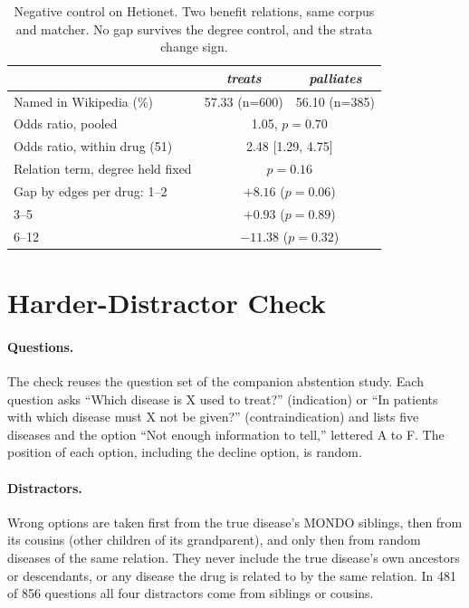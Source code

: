 \documentclass[letterpaper]{article} %
\begin{document}
\begin{table}[h]
\centering
\footnotesize
\setlength{\tabcolsep}{3pt}
\begin{tabular}{lcc}
\toprule
 & \emph{treats} & \emph{palliates} \\
\midrule
Named in Wikipedia (\%) & 57.33 (n=600) & 56.10 (n=385) \\
Odds ratio, pooled & \multicolumn{2}{c}{1.05, $p = 0.70$} \\
Odds ratio, within drug (51) & \multicolumn{2}{c}{2.48 [1.29, 4.75]} \\
Relation term, degree held fixed & \multicolumn{2}{c}{$p = 0.16$} \\
\midrule
Gap by edges per drug: 1--2 & \multicolumn{2}{c}{$+8.16$ ($p = 0.06$)} \\
\phantom{Gap by edges per drug:} 3--5 & \multicolumn{2}{c}{$+0.93$ ($p = 0.89$)} \\
\phantom{Gap by edges per drug:} 6--12 & \multicolumn{2}{c}{$-11.38$ ($p = 0.32$)} \\
\bottomrule
\end{tabular}
\caption{Negative control on Hetionet. Two benefit relations, same corpus and
matcher. No gap survives the degree control, and the strata change sign.}
\label{tab:hetionet}
\end{table}

\section{Harder-Distractor Check}

\paragraph{Questions.}
The check reuses the question set of the companion abstention study. Each
question asks ``Which disease is X used to treat?'' (indication) or ``In
patients with which disease must X not be given?'' (contraindication) and
lists five diseases and the option ``Not enough information to tell,''
lettered A to F. The position of each option, including the decline option,
is random.

\paragraph{Distractors.}
Wrong options are taken first from the true disease's MONDO siblings, then
from its cousins (other children of its grandparent), and only then from
random diseases of the same relation. They never include the true disease's
own ancestors or descendants, or any disease the drug is related to by the
same relation. In 481 of 856 questions all four distractors come from siblings
or cousins.
\end{document}
